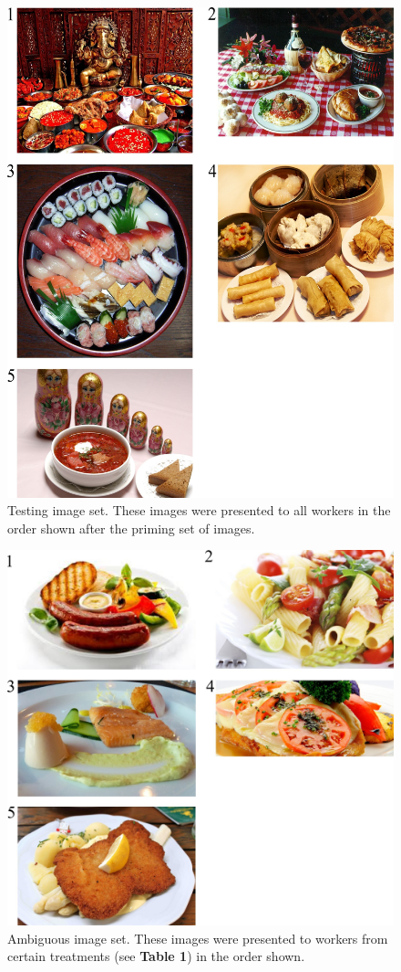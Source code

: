 \documentclass[a4paper]{report}
\begin{document}
\begin{figure}
	\includegraphics[scale=1.00]{figs/taskImages/testImages.jpg}
	\caption{Testing image set. These images were presented to all workers in 
		the order shown after the priming set of images.}
\end{figure}

\begin{figure}
	\includegraphics[scale=1.00]{figs/taskImages/ambiguous.jpg}
	\caption{ Ambiguous image set. These images were presented to workers from 
		certain treatments (see \textbf{Table 1}) in the order shown.}
\end{figure}
\end{document}
